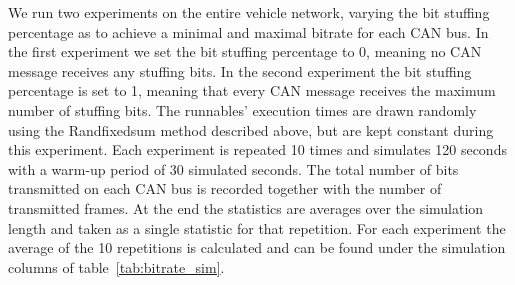 We run two experiments on the entire vehicle network, varying the bit stuffing percentage as to achieve a minimal and maximal bitrate for each CAN bus. In the first experiment we set the bit stuffing percentage to 0, meaning no CAN message receives any stuffing bits. In the second experiment the bit stuffing percentage is set to 1, meaning that every CAN message receives the maximum number of stuffing bits. The runnables' execution times are drawn randomly using the Randfixedsum method described above, but are kept constant during this experiment. Each experiment is repeated 10 times and simulates 120 seconds with a warm-up period of 30 simulated seconds. The total number of bits transmitted on each CAN bus is recorded together with the number of transmitted frames. At the end the statistics are averages over the simulation length and taken as a single statistic for that repetition. For each experiment the average of the 10 repetitions is calculated and can be found under the simulation columns of table~\ref{tab:bitrate_sim}.

